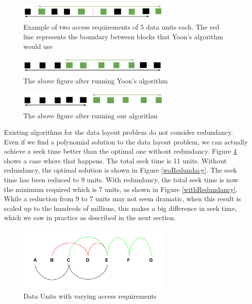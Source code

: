 \documentclass[conference]{acmsiggraph}
\begin{document}
\begin{figure}[ht]
\centering
\includegraphics[width=3in]{ImprovementOverYoon_before.jpg}
\caption{Example of two access requirements of 5 data units each. The red line represents the boundary between blocks that Yoon's algorithm would use}
\label{YoonImprovement1}
\end{figure}

\begin{figure}[ht]
\centering
\includegraphics[width=3in]{ImprovementOverYoon_afterYoons.jpg}
\caption{The above figure after running Yoon's algorithm}
\label{YoonImprovement2}
\end{figure}

\begin{figure}[ht]
\centering
\includegraphics[width=3in]{ImprovementOverYoon_afterOurs.jpg}
\caption{The above figure after running our algorithm}
\label{YoonImprovement3}
\end{figure}

Existing algorithms for the data layout problem do not consider redundancy. Even if we find a polynomial solution to the data layout problem, we can actually achieve a seek time better than the optimal one without redundancy. Figure \ref{fig:startingProb} shows a case where that happens. The total seek time is 11 units. Without redundancy, the optimal solution is shown in Figure \ref{woRedundacy}. The seek time has been reduced to 9 units. With redundancy, the total seek time is now the minimum required which is 7 units, as shown in Figure \ref{withRedundancy}. While a reduction from 9 to 7 units may not seem dramatic, when this result is scaled up to the hundreds of millions, this makes a big difference in seek time, which we saw in practice as described in the next section.\\

\begin{figure}[ht]
\centering
\includegraphics[width=3in]{examplePic_startingProblem.png}
\caption{Data Units with varying access requirements}
\label{fig:startingProb}
\end{figure}
\end{document}
